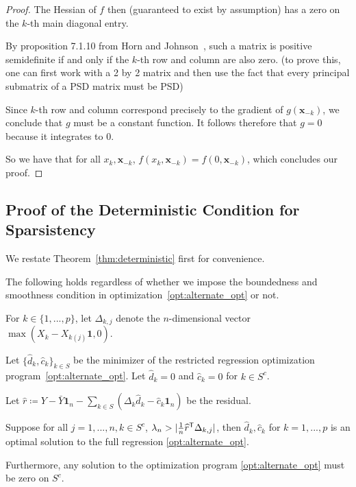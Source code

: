 \begin{proof}
The Hessian of $f$ then (guaranteed to exist by assumption) has a zero on the $k$-th main diagonal entry. 

By proposition 7.1.10 from Horn and Johnson~\cite{HJ90},  such a matrix is positive semidefinite if and only if the $k$-th row and column are also zero. (to prove this, one can first work with a 2 by 2 matrix and then use the fact that every principal submatrix of a PSD matrix must be PSD) 

Since $k$-th row and column correspond precisely to the gradient of $g(\mathbf{x}_{-k})$, we conclude that $g$ must be a constant function. It follows therefore that $g = 0$ because it integrates to 0. 

So we have that for all $x_k, \mathbf{x}_{-k}$, $f(x_k, \mathbf{x}_{-k}) = f(0, \mathbf{x}_{-k})$, which concludes our proof.

\end{proof}
 

 
 

 
 
 
 \subsection{Proof of the Deterministic Condition for Sparsistency}
 \label{sec:deterministic_proof}
 
 We restate Theorem~\ref{thm:deterministic} first for convenience.
 
\begin{theorem} 
The following holds regardless of whether we impose the boundedness and smoothness condition in optimization~\ref{opt:alternate_opt} or not.

For $k \in \{1,...,p\}$, let $\Delta_{k, j}$ denote the $n$-dimensional vector $\max( X_k - X_{k (j)} \mathbf{1}, 0)$. 

Let $\{\hat{d}_k, \hat{c}_k \}_{k \in S}$ be the minimizer of the restricted regression optimization program~\ref{opt:alternate_opt}. 
Let $\hat{d}_k = 0$ and $ \hat{c}_k = 0$ for $k \in S^c$.

Let $\hat{r} \coloneqq Y - \bar{Y} \mathbf{1}_n - \sum_{k \in S} (\Delta_k \hat{d}_k - \hat{c}_k \mathbf{1}_n) $ be the residual.

Suppose for all $j=1,...,n, k\in S^c$, $\lambda_n > | \frac{1}{n} \widehat{r}^{\mathsf{T}} \Delta_{k,j}|$, then $\hat{d}_k, \hat{c}_k$ for $k=1,...,p$ is an optimal solution to the full regression \ref{opt:alternate_opt}.

Furthermore, any solution to the optimization program \ref{opt:alternate_opt} must be zero on $S^c$.
\end{theorem}

